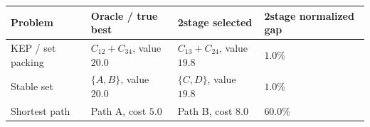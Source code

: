 \begin{tabular}{llll}
\toprule
Problem & Oracle / true best & 2stage selected & 2stage normalized gap \\
\midrule
KEP / set packing & $C_{12}+C_{34}$, value $20.0$ & $C_{13}+C_{24}$, value $19.8$ & $1.0\%$ \\
Stable set & $\{A,B\}$, value $20.0$ & $\{C,D\}$, value $19.8$ & $1.0\%$ \\
Shortest path & Path A, cost $5.0$ & Path B, cost $8.0$ & $60.0\%$ \\
\bottomrule
\end{tabular}
